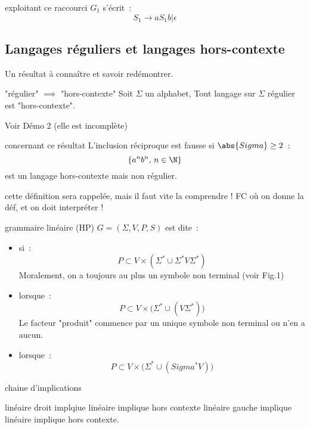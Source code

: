 \begin{adjustwidth}{-3cm}{-3cm}
\begin{exemple}{}{exploitant ce raccourci}
    $G_1$ s'écrit~:
    $$S_1 \rightarrow aS_1b \vert \epsilon$$
\end{exemple}

\subsection{Langages réguliers et langages hors-contexte}

Un résultat à connaître et savoir redémontrer.
\begin{proposition}{}{"régulier" $\implies$ "hors-contexte"}
    Soit $\Sigma$ un alphabet, Tout langage sur $\Sigma$ régulier est "hors-contexte".
\end{proposition}
Voir Démo 2 (elle est incomplète)

\begin{remarque}{}{concernant ce résultat}
    L'inclusion réciproque est fausse si $\abs{Sigma} \geq 2$~:
    $$\{a^nb^n,\, n \in \N\}$$
    est un langage hors-contexte mais non régulier.
\end{remarque}

cette définition sera rappelée, mais il faut vite la comprendre ! FC où on donne la déf, et on doit interpréter !
\begin{definition}{}{grammaire linéaire (HP)}
    $G = (\Sigma, V, P, S)$ est dite~:
    \begin{itemize}
        \item {} si~:
        $$P \subset V \times (\Sigma^* \cup \Sigma^*V\Sigma^*)$$
        Moralement, on a toujours au plus un symbole non terminal (voir Fig.1)
        \item {} lorsque~:
        $$P \subset V \times \bigg( \Sigma^* \cup (V \Sigma^*) \bigg)$$
        Le facteur "produit" commence par un unique symbole non terminal ou n'en a aucun.
        \item {} lorsque~:
        $$P \subset V \times \bigg( \Sigma^* \cup (Sigma^*V) \bigg)$$
    \end{itemize}
\end{definition}

\begin{remarque}{}{chaine d'implications}

    linéaire droit implqiue linéaire implique hors contexte
    linéaire gauche implique linéaire implique hors contexte.
    
\end{remarque}


\end{adjustwidth}
